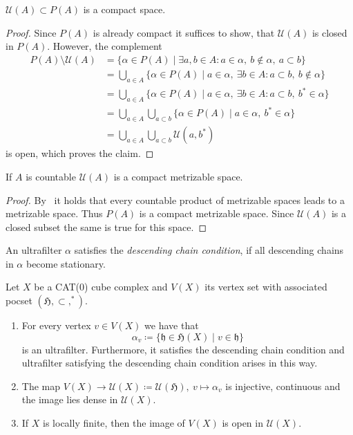 \begin{prop}
  \(\mathcal{U}(A) \subset P(A)\) is a compact space.
\end{prop}

\begin{proof}
  Since \(P(A)\) is already compact it suffices to show, that \(\mathcal{U}(A)\) is closed in \(P(A)\). However, the complement
  \begin{align*}
    P(A) \setminus \mathcal{U}(A)
    & = \{\alpha \in P(A) \mid \exists a, b \in A\colon a \in \alpha,\ b \notin \alpha,\ a \subset b\}\\
    & = \bigcup_{a \in A} \{\alpha \in P(A) \mid a \in \alpha,\ \exists b \in A\colon a \subset b,\ b \notin \alpha\}\\
    & = \bigcup_{a \in A} \{\alpha \in P(A) \mid a \in \alpha,\ \exists b \in A\colon a \subset b,\ b^\ast \in \alpha\}\\
    & = \bigcup_{a \in A} \bigcup_{a \subset b}\{\alpha \in P(A) \mid a \in \alpha,\ b^\ast \in \alpha\}\\
    & = \bigcup_{a \in A} \bigcup_{a \subset b}\mathcal{U}(a, b^\ast)
  \end{align*}
  is open, which proves the claim.
\end{proof}

\begin{cor}
  \label{cor:comp-met}
  If \(A\) is countable \(\mathcal{U}(A)\) is a compact metrizable space.
\end{cor}

\begin{proof}
  By~\textcite[Thm.\ 4.2.2]{Engelking} it holds that every countable product of metrizable spaces leads to a metrizable space. Thus \(P(A)\) is a compact metrizable space. Since \(\mathcal{U}(A)\) is a closed subset the same is true for this space.
\end{proof}

\begin{defin}
  An ultrafilter \(\alpha\) satisfies the \emph{descending chain condition}, if all descending chains in \(\alpha\) become stationary.
\end{defin}

\begin{thm}
  Let \(X\) be a CAT(0) cube complex and \(V(X)\) its vertex set with associated pocset \((\mathfrak{H}, \subset, ^\ast)\).
  \begin{enumerate}
  \item For every vertex \(v \in V(X)\) we have that
    \[
      \alpha_v \coloneqq \{\mathfrak{h} \in \mathfrak{H}(X) \mid v \in \mathfrak{h}\}
    \]
    is an ultrafilter. Furthermore, it satisfies the descending chain condition and ultrafilter satisfying the descending chain condition arises in this way.
  \item The map \(V(X) \to \mathcal{U}(X) \coloneqq \mathcal{U}(\mathfrak{H}),\ v \mapsto \alpha_v\) is injective, continuous and the image lies dense in \(\mathcal{U}(X)\). 
  \item If \(X\) is locally finite, then the image of \(V(X)\) is open in \(\mathcal{U}(X)\).
  \end{enumerate}
\end{thm}


